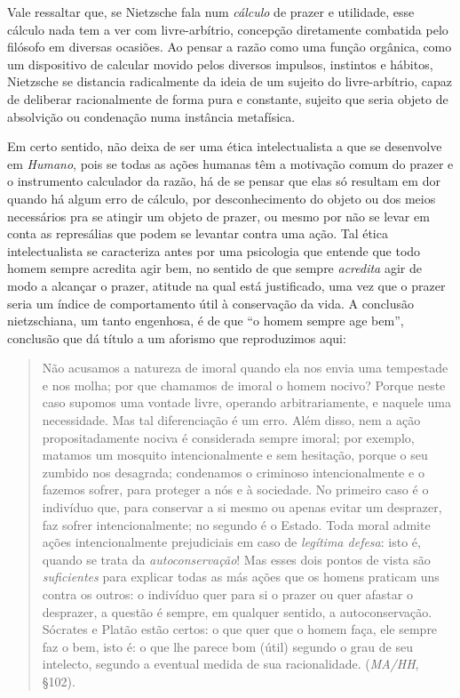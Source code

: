 \documentclass[
	12pt,				%
	openright,			%
	oneside,			%
	a4paper,			%
	english,			%
	french,				%
	spanish,			%
	brazil				%
	]{abntex2}
\begin{document}
	Vale ressaltar que, se Nietzsche fala num \textit{cálculo} de prazer e utilidade, esse cálculo nada tem a ver com livre-arbítrio, concepção diretamente combatida pelo filósofo em diversas ocasiões. Ao pensar a razão como uma função orgânica, como um dispositivo de calcular movido pelos diversos impulsos, instintos e hábitos, Nietzsche se distancia radicalmente da ideia de um sujeito do livre-arbítrio, capaz de deliberar racionalmente de forma pura e constante, sujeito que seria objeto de absolvição ou condenação numa instância metafísica.
	
	Em certo sentido, não deixa de ser uma ética intelectualista a que se desenvolve em \textit{Humano}, pois se todas as ações humanas têm a motivação comum do prazer e o instrumento calculador da razão, há de se pensar que elas só resultam em dor quando há algum erro de cálculo, por desconhecimento do objeto ou dos meios necessários pra se atingir um objeto de prazer, ou mesmo por não se levar em conta as represálias que podem se levantar contra uma ação. Tal ética intelectualista se caracteriza antes por uma psicologia que entende que todo homem sempre acredita agir bem, no sentido de que sempre \textit{acredita} agir de modo a alcançar o prazer, atitude na qual está justificado, uma vez que o prazer seria um índice de comportamento útil à conservação da vida. A conclusão nietzschiana, um tanto engenhosa, é de que “o homem sempre age bem”, conclusão que dá título a um aforismo que reproduzimos aqui:
	
\begin{quotation}
Não acusamos a natureza de imoral quando ela nos envia uma tempestade e nos molha; por que chamamos de imoral o homem nocivo? Porque neste caso supomos uma vontade livre, operando arbitrariamente, e naquele uma necessidade. Mas tal diferenciação é um erro. Além disso, nem a ação propositadamente nociva é considerada sempre imoral; por exemplo, matamos um mosquito intencionalmente e sem hesitação, porque o seu zumbido nos desagrada; condenamos o criminoso intencionalmente e o fazemos sofrer, para proteger a nós e à sociedade. No primeiro caso é o indivíduo que, para conservar a si mesmo ou apenas evitar um desprazer, faz sofrer intencionalmente; no segundo é o Estado. Toda moral admite ações intencionalmente prejudiciais em caso de \textit{legítima defesa}: isto é, quando se trata da \textit{autoconservação}! Mas esses dois pontos de vista são \textit{suficientes} para explicar todas as más ações que os homens praticam uns contra os outros: o indivíduo quer para si o prazer ou quer afastar o desprazer, a questão é sempre, em qualquer sentido, a autoconservação. Sócrates e Platão estão certos: o que quer que o homem faça, ele sempre faz o bem, isto é: o que lhe parece bom (útil) segundo o grau de seu intelecto, segundo a eventual medida de sua racionalidade. (\textit{MA/HH}, §102).
\end{quotation}
\end{document}
